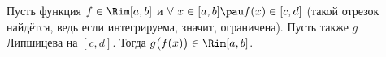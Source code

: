
 	Пусть функция $f\in\Rim[a,b]$ и $\forall\  x\in[a,b]\pau f(x)\in[c,d]$ (такой отрезок найдётся, ведь если интегрируема, значит, ограничена).
 	Пусть также $g$ Липшицева на $[c,d]$. Тогда $g\big(f(x)\big)\in\Rim[a,b]$.
 